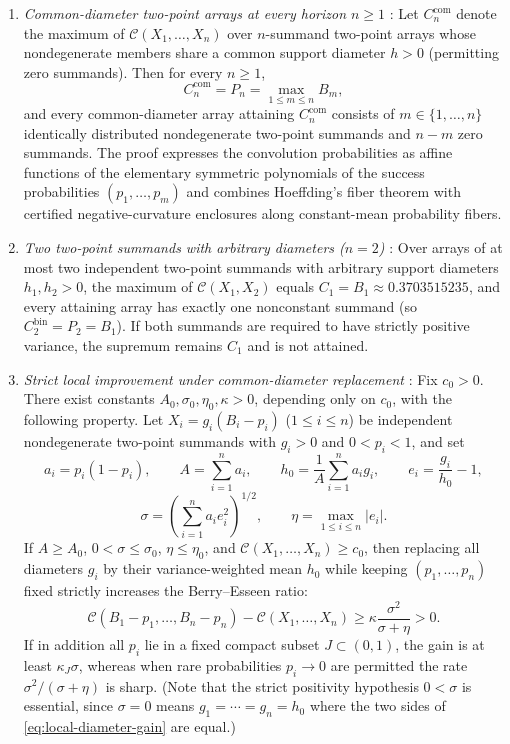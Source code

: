 \documentclass[11pt]{article}
\numberwithin{equation}{section}
\theoremstyle{definition}
\theoremstyle{remark}
\begin{document}
\begin{enumerate}[label=(\arabic*),leftmargin=2em]
\item \emph{Common-diameter two-point arrays at every horizon $n\ge1$}
\citep[Theorem~1.1]{BellBernoulli2026}: Let $C_n^{\mathrm{com}}$ denote the
maximum of $\mathcal C(X_1,\ldots,X_n)$ over $n$-summand two-point arrays
whose nondegenerate members share a common support diameter $h>0$ (permitting
zero summands). Then for every $n\ge1$,
\begin{equation}\label{eq:cn-com-theorem}
 C_n^{\mathrm{com}}=P_n=\max_{1\le m\le n}B_m,
\end{equation}
and every common-diameter array attaining $C_n^{\mathrm{com}}$ consists of
$m\in\{1,\ldots,n\}$ identically distributed nondegenerate two-point summands
and $n-m$ zero summands. The proof expresses the convolution probabilities as
affine functions of the elementary symmetric polynomials of the success
probabilities $(p_1,\ldots,p_m)$ and combines Hoeffding's fiber theorem
\citep{Hoeffding1956} with certified negative-curvature enclosures along
constant-mean probability fibers.

\item \emph{Two two-point summands with arbitrary diameters ($n=2$)}
\citep[Theorem~1.2]{BellBernoulli2026}: Over arrays of at most two independent
two-point summands with arbitrary support diameters $h_1,h_2>0$, the maximum
of $\mathcal C(X_1,X_2)$ equals $C_1=B_1\approx0.3703515235$, and every
attaining array has exactly one nonconstant summand (so $C_2^{\mathrm{bin}}=P_2=B_1$).
If both summands are required to have strictly positive variance, the supremum
remains $C_1$ and is not attained.

\item \emph{Strict local improvement under common-diameter replacement}
\citep[Theorem~1.3]{BellBernoulli2026}: Fix $c_0>0$. There exist constants
$A_0,\sigma_0,\eta_0,\kappa>0$, depending only on $c_0$, with the following
property. Let $X_i=g_i(B_i-p_i)$ ($1\le i\le n$) be independent nondegenerate
two-point summands with $g_i>0$ and $0<p_i<1$, and set
\[
 a_i=p_i(1-p_i),\qquad
 A=\sum_{i=1}^n a_i,\qquad
 h_0=\frac1A\sum_{i=1}^n a_i g_i,\qquad
 e_i=\frac{g_i}{h_0}-1,
\]
\[
 \sigma=\left(\sum_{i=1}^n a_i e_i^2\right)^{1/2},\qquad
 \eta=\max_{1\le i\le n}|e_i|.
\]
If $A\ge A_0$, $0<\sigma\le\sigma_0$, $\eta\le\eta_0$, and
$\mathcal C(X_1,\ldots,X_n)\ge c_0$, then replacing all diameters $g_i$ by
their variance-weighted mean $h_0$ while keeping $(p_1,\ldots,p_n)$ fixed
strictly increases the Berry--Esseen ratio:
\begin{equation}\label{eq:local-diameter-gain}
 \mathcal C(B_1-p_1,\ldots,B_n-p_n)-\mathcal C(X_1,\ldots,X_n)
 \ge\kappa\frac{\sigma^2}{\sigma+\eta}>0.
\end{equation}
If in addition all $p_i$ lie in a fixed compact subset $J\subset(0,1)$, the
gain is at least $\kappa_J\sigma$, whereas when rare probabilities $p_i\to0$
are permitted the rate $\sigma^2/(\sigma+\eta)$ is sharp. (Note that the
strict positivity hypothesis $0<\sigma$ is essential, since $\sigma=0$ means
$g_1=\cdots=g_n=h_0$ where the two sides of \eqref{eq:local-diameter-gain}
are equal.)


\end{enumerate}
\end{document}
